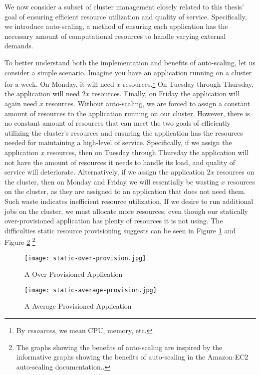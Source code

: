 We now consider a subset of cluster management closely related to
this thesis' goal of ensuring efficient resource utilization and quality of
service. Specifically, we introduce
auto-scaling, a method of ensuring each application has the necessary amount
of computational resources to handle varying external
demands.

To better understand both the implementation and benefits of auto-scaling, let
us consider a simple scenario. Imagine you have an application running on a
cluster for a week. On Monday, it will need $x$ resources.\footnote{By
  \textit{resources}, we mean CPU, memory, etc.} On Tuesday through
Thursday, the application will need $2x$ resources. Finally, on Friday the
application will again need $x$ resources. Without auto-scaling, we are forced
to assign a constant amount of resources to the application running on our
cluster. However, there is no constant amount of resources that can meet
the two goals of efficiently utilizing the cluster's resources and ensuring the
application has the resources needed for maintaining a high-level of service.
Specifically, if we assign the application $x$ resources,
then on Tuesday through Thursday the
application will not have the amount of resources it needs to handle its load,
and quality of service will deteriorate. Alternatively, if we assign the
application $2x$ resources on the cluster, then on Monday and Friday we will
essentially be wasting $x$ resources on the cluster, as they are assigned to an
application that does not need them. Such waste indicates inefficient
resource utilization. If we desire to run additional jobs on the cluster, we
must allocate more resources, even though our statically over-provisioned
application has plenty of resources it is not using.
The difficulties static resource provisioning suggests can
be seen in Figure \ref{fig:static-over-provision} and Figure
\ref{fig:static-average-provision} \footnote{The graphs showing the
  benefits of auto-scaling are inspired by the informative graphs
showing the benefits of auto-scaling in the Amazon EC2 auto-scaling
documentation.\cite{amazon-ec2}.}

\begin{figure}[!h]
  \centerline{\texttt{[image: static-over-provision.jpg]}}
  \caption{A Over Provisioned Application}
  \label{fig:static-over-provision}
\end{figure}

\begin{figure}[!h]
  \centerline{\texttt{[image: static-average-provision.jpg]}}
  \caption{A Average Provisioned Application}
  \label{fig:static-average-provision}
\end{figure}

